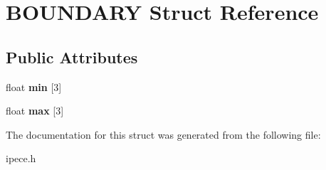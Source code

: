 \hypertarget{struct_b_o_u_n_d_a_r_y}{\section{B\-O\-U\-N\-D\-A\-R\-Y Struct Reference}
\label{struct_b_o_u_n_d_a_r_y}
}
\subsection*{Public Attributes}
\begin{DoxyCompactItemize}
\item 
\hypertarget{struct_b_o_u_n_d_a_r_y_a4f7d8961a5b5db7c9b9242ed2ca8eefd}{float {\bfseries min} \mbox{[}3\mbox{]}}\label{struct_b_o_u_n_d_a_r_y_a4f7d8961a5b5db7c9b9242ed2ca8eefd}

\item 
\hypertarget{struct_b_o_u_n_d_a_r_y_a8498f633075eff074377ed9f2f4c5513}{float {\bfseries max} \mbox{[}3\mbox{]}}\label{struct_b_o_u_n_d_a_r_y_a8498f633075eff074377ed9f2f4c5513}

\end{DoxyCompactItemize}


The documentation for this struct was generated from the following file\-:\begin{DoxyCompactItemize}
\item 
ipece.\-h\end{DoxyCompactItemize}

